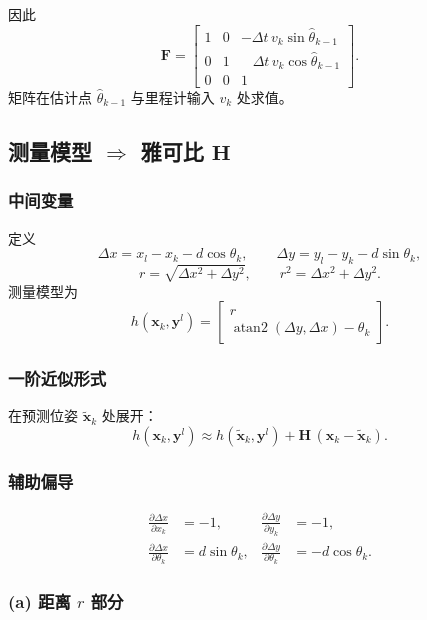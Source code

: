 \documentclass[12pt]{article}
\newcommand{\atantwo}{\operatorname{atan2}}
\begin{document}
因此
\[
\boxed{\;
\mathbf{F}=
\begin{bmatrix}
1 & 0 & -\Delta t\,v_k\sin\hat{\theta}_{k-1}\\[4pt]
0 & 1 & \;\;\;\Delta t\,v_k\cos\hat{\theta}_{k-1}\\[4pt]
0 & 0 & 1
\end{bmatrix}.
\;}
\]
矩阵在估计点 $\hat{\theta}_{k-1}$ 与里程计输入 $v_k$ 处求值。

\subsection*{测量模型 $\Rightarrow$ 雅可比 $\mathbf{H}$}

\subsubsection*{中间变量}

定义
\[
\Delta x = x_l-x_k-d\cos\theta_k,\qquad
\Delta y = y_l-y_k-d\sin\theta_k,
\]
\[
r=\sqrt{\Delta x^2+\Delta y^2},\qquad r^2=\Delta x^2+\Delta y^2.
\]
测量模型为
\[
h(\mathbf{x}_k,\mathbf{y}^l)=
\begin{bmatrix}
r\\[3pt]
\atantwo(\Delta y,\Delta x)-\theta_k
\end{bmatrix}.
\]

\subsubsection*{一阶近似形式}

在预测位姿 $\tilde{\mathbf{x}}_k$ 处展开：
\[
h(\mathbf{x}_k,\mathbf{y}^l)\approx
h(\tilde{\mathbf{x}}_k,\mathbf{y}^l)
+\mathbf{H}\,(\mathbf{x}_k-\tilde{\mathbf{x}}_k).
\]

\subsubsection*{辅助偏导}

\begin{align*}
\frac{\partial \Delta x}{\partial x_k}&=-1, &
\frac{\partial \Delta y}{\partial y_k}&=-1,\\[4pt]
\frac{\partial \Delta x}{\partial \theta_k}&=d\sin\theta_k, &
\frac{\partial \Delta y}{\partial \theta_k}&=-d\cos\theta_k.
\end{align*}

\subsubsection*{(a) 距离 $r$ 部分}
\end{document}

